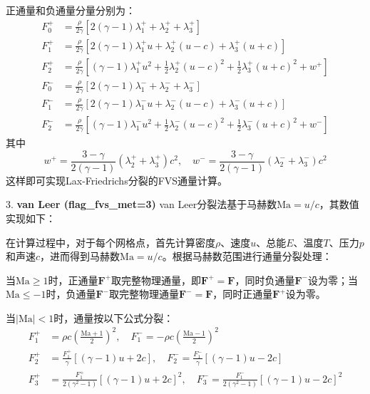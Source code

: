 \documentclass[12pt,a4paper]{article}
\begin{document}
    正通量和负通量分量分别为：
    \begin{align*}
    F^+_0 &= \frac{\rho}{2\gamma} \left[2(\gamma-1)\lambda_1^+ + \lambda_2^+ + \lambda_3^+\right] \\
    F^+_1 &= \frac{\rho}{2\gamma} \left[2(\gamma-1)\lambda_1^+ u + \lambda_2^+(u-c) + \lambda_3^+(u+c)\right] \\
    F^+_2 &= \frac{\rho}{2\gamma} \left[(\gamma-1)\lambda_1^+ u^2 + \frac{1}{2}\lambda_2^+(u-c)^2 + \frac{1}{2}\lambda_3^+(u+c)^2 + w^+\right] \\
    F^-_0 &= \frac{\rho}{2\gamma} \left[2(\gamma-1)\lambda_1^- + \lambda_2^- + \lambda_3^-\right] \\
    F^-_1 &= \frac{\rho}{2\gamma} \left[2(\gamma-1)\lambda_1^- u + \lambda_2^-(u-c) + \lambda_3^-(u+c)\right] \\
    F^-_2 &= \frac{\rho}{2\gamma} \left[(\gamma-1)\lambda_1^- u^2 + \frac{1}{2}\lambda_2^-(u-c)^2 + \frac{1}{2}\lambda_3^-(u+c)^2 + w^-\right]
    \end{align*}
    其中
    $$
    w^+ = \frac{3-\gamma}{2(\gamma-1)}(\lambda_2^+ + \lambda_3^+)c^2, \quad
    w^- = \frac{3-\gamma}{2(\gamma-1)}(\lambda_2^- + \lambda_3^-)c^2
    $$
    这样即可实现Lax-Friedrichs分裂的FVS通量计算。

3. \textbf{van Leer (flag\_fvs\_met=3)}  
    van Leer分裂法基于马赫数$\mathrm{Ma}=u/c$，其数值实现如下：

    在计算过程中，对于每个网格点，首先计算密度$\rho$、速度$u$、总能$E$、温度$T$、压力$p$和声速$c$，进而得到马赫数$\mathrm{Ma}=u/c$。根据马赫数范围进行通量分裂处理：

当$\mathrm{Ma} \geq 1$时，正通量$\mathbf{F}^+$取完整物理通量，即$\mathbf{F}^+ = \mathbf{F}$，同时负通量$\mathbf{F}^-$设为零；当$\mathrm{Ma} \leq -1$时，负通量$\mathbf{F}^-$取完整物理通量$\mathbf{F}^- = \mathbf{F}$，同时正通量$\mathbf{F}^+$设为零。

当$|\mathrm{Ma}| < 1$时，通量按以下公式分裂：
$$
\begin{aligned}
F_1^+ &= \rho c \left(\frac{\mathrm{Ma}+1}{2}\right)^2, \quad
F_1^- = -\rho c \left(\frac{\mathrm{Ma}-1}{2}\right)^2 \\
F_2^+ &= \frac{F_1^+}{\gamma} \left[(\gamma-1)u + 2c\right], \quad
F_2^- = \frac{F_1^-}{\gamma} \left[(\gamma-1)u - 2c\right] \\
F_3^+ &= \frac{F_1^+}{2(\gamma^2-1)} \left[(\gamma-1)u + 2c\right]^2, \quad
F_3^- = \frac{F_1^-}{2(\gamma^2-1)} \left[(\gamma-1)u - 2c\right]^2
\end{aligned}
$$
\end{document}
